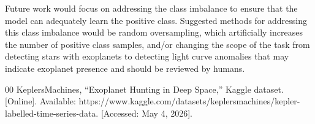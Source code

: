 \documentclass[conference]{IEEEtran}
\begin{document}
Future work would focus on addressing the class imbalance to ensure that the model can adequately learn the positive class. Suggested methods for addressing this class imbalance would be random oversampling, which artificially increases the number of positive class samples, and/or changing the scope of the task from detecting stars with exoplanets to detecting light curve anomalies that may indicate exoplanet presence and should be reviewed by humans.

\begin{thebibliography}{00}
 KeplersMachines, ``Exoplanet Hunting in Deep Space,'' Kaggle dataset. [Online]. Available: https://www.kaggle.com/datasets/keplersmachines/kepler-labelled-time-series-data. [Accessed: May 4, 2026].
\end{thebibliography}
\end{document}
